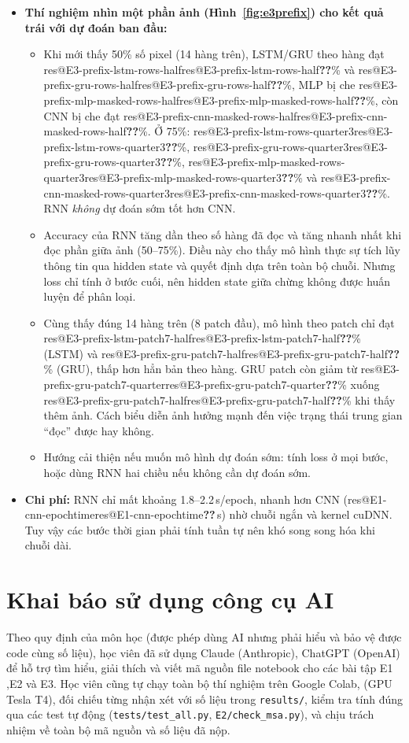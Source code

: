 \documentclass[twoside,final]{hcmut-report}
\makeatletter
\newcommand{\res}[1]{\ifcsname res@#1\endcsname\csname res@#1\endcsname\else\textbf{??}\fi}
\makeatother
\begin{document}
\begin{itemize}
        \res{E3-lstm-rows-vallossmin-epoch}); khoảng cách train–val khoảng 3--4 điểm. Nhiều khả năng còn cải thiện nếu huấn luyện lâu hơn, khác với CNN đã bắt đầu tăng val loss.
  \item \textbf{Thí nghiệm nhìn một phần ảnh (Hình~\ref{fig:e3prefix}) cho kết quả trái với dự đoán ban đầu:}
        \begin{itemize}
          \item Khi mới thấy 50\% số pixel (14 hàng trên), LSTM/GRU theo hàng đạt \res{E3-prefix-lstm-rows-half}\%
                và \res{E3-prefix-gru-rows-half}\%, MLP bị che \res{E3-prefix-mlp-masked-rows-half}\%, còn CNN bị
                che đạt \res{E3-prefix-cnn-masked-rows-half}\%. Ở 75\%: \res{E3-prefix-lstm-rows-quarter3}\%,
                \res{E3-prefix-gru-rows-quarter3}\%, \res{E3-prefix-mlp-masked-rows-quarter3}\% và
                \res{E3-prefix-cnn-masked-rows-quarter3}\%. RNN \emph{không} dự đoán sớm tốt hơn CNN.
          \item Accuracy của RNN tăng dần theo số hàng đã đọc và tăng nhanh nhất khi đọc phần giữa ảnh (50--75\%).
                Điều này cho thấy mô hình thực sự tích lũy thông tin qua hidden state và quyết định dựa trên toàn bộ chuỗi. Nhưng loss chỉ tính ở bước cuối, nên hidden state giữa chừng không được huấn luyện để phân loại.
          \item Cùng thấy đúng 14 hàng trên (8 patch đầu), mô hình theo patch chỉ đạt
                \res{E3-prefix-lstm-patch7-half}\% (LSTM) và \res{E3-prefix-gru-patch7-half}\% (GRU), thấp hơn hẳn
                bản theo hàng. GRU patch còn giảm từ \res{E3-prefix-gru-patch7-quarter}\% xuống \res{E3-prefix-gru-patch7-half}\% khi thấy thêm ảnh. Cách biểu diễn ảnh hưởng mạnh đến việc trạng thái trung gian ``đọc'' được hay không.
          \item Hướng cải thiện nếu muốn mô hình dự đoán sớm: tính loss ở mọi bước, hoặc dùng RNN hai chiều nếu không cần dự đoán sớm.
        \end{itemize}
  \item \textbf{Chi phí:} RNN chỉ mất khoảng 1.8--2.2\,s/epoch, nhanh hơn CNN (\res{E1-cnn-epochtime}\,s) nhờ chuỗi ngắn và kernel cuDNN. Tuy vậy các bước thời gian phải tính tuần tự nên khó song song hóa khi chuỗi dài.
\end{itemize}

\section{Khai báo sử dụng công cụ AI}
Theo quy định của môn học (được phép dùng AI nhưng phải hiểu và bảo vệ được code cùng số liệu), học viên đã sử dụng Claude (Anthropic), ChatGPT (OpenAI) để hỗ trợ tìm hiểu, giải thích và viết mã nguồn file notebook cho các bài tập E1 ,E2 và E3. Học viên cũng tự chạy toàn bộ thí nghiệm trên Google Colab, (GPU Tesla T4), đối chiếu từng nhận xét với số liệu trong \texttt{results/}, kiểm tra tính đúng qua các test tự động (\texttt{tests/test\_all.py}, \texttt{E2/check\_msa.py}), và chịu trách nhiệm về toàn bộ mã nguồn và số liệu đã nộp.
\end{document}
